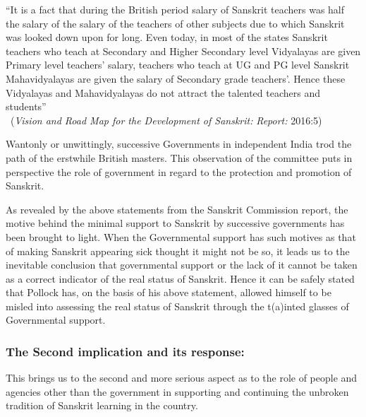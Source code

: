 \begin{myquote}
\eleven
“It is a fact that during the British period salary of Sanskrit teachers was half the salary of the salary of the teachers of other subjects due to which Sanskrit was looked down upon for long. Even today, in most of the states Sanskrit teachers who teach at Secondary and Higher Secondary level Vidyalayas are given Primary level teachers’ salary, teachers who teach at UG and PG level Sanskrit Mahavidyalayas are given the salary of Secondary grade teachers’. Hence these Vidyalayas and Mahavidyalayas do not attract the talented teachers and students”\\[-15pt]  

~\hfill({\sl Vision and Road Map for the Development of Sanskrit:} {\sl Report:} 2016:5) 
\end{myquote}

Wantonly or unwittingly, successive Governments in independent India trod the path of the erstwhile British masters. This observation of the committee puts in perspective the role of government in regard to the protection and promotion of Sanskrit. 

As revealed by the above statements from the Sanskrit Commission report, the motive behind the minimal support to Sanskrit by successive governments has been brought to light. When the Governmental support has such motives as that of making Sanskrit appearing sick thought it might not be so, it leads us to the inevitable conclusion that  governmental support or the lack of it cannot be taken as a correct indicator of the real status of Sanskrit. Hence it can be safely stated that Pollock has, on the basis of his above statement, allowed himself to be misled into assessing the real status of Sanskrit through the t(a)inted glasses of Governmental support.

\subsubsection{The Second implication and its response:}

This brings us to the second and more serious aspect as to the role of people and agencies other than the government in supporting and continuing the unbroken tradition of Sanskrit learning in the country.

